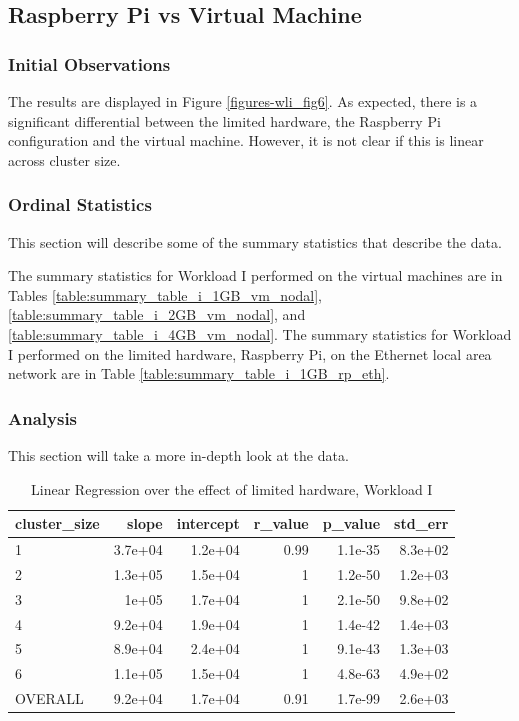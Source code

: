\subsection{Raspberry Pi vs Virtual Machine}
\subsubsection{Initial Observations}
The results are displayed in Figure \ref{figures-wli_fig6}.  As expected, there is a significant differential between the limited hardware, the Raspberry Pi configuration and the virtual machine.  However, it is not clear if this is linear across cluster size. 

\subsubsection{Ordinal Statistics}
This section will describe some of the summary statistics that describe the data.  

The summary statistics for Workload I performed on the virtual machines are in Tables \ref{table:summary_table_i_1GB_vm_nodal}, \ref{table:summary_table_i_2GB_vm_nodal}, and \ref{table:summary_table_i_4GB_vm_nodal}.
The summary statistics for Workload I performed on the limited hardware, Raspberry Pi, on the Ethernet local area network are in Table \ref{table:summary_table_i_1GB_rp_eth}.



\subsubsection{Analysis}
This section will take a more in-depth look at the data.




\begin{table}[H]
\centering
\begin{tabular}{lrrrrr}
\toprule
cluster\_size &   slope &  intercept &  r\_value &  p\_value &  std\_err \\
\midrule
           1 & 3.7e+04 &    1.2e+04 &     0.99 &  1.1e-35 &  8.3e+02 \\
           2 & 1.3e+05 &    1.5e+04 &        1 &  1.2e-50 &  1.2e+03 \\
           3 &   1e+05 &    1.7e+04 &        1 &  2.1e-50 &  9.8e+02 \\
           4 & 9.2e+04 &    1.9e+04 &        1 &  1.4e-42 &  1.4e+03 \\
           5 & 8.9e+04 &    2.4e+04 &        1 &  9.1e-43 &  1.3e+03 \\
           6 & 1.1e+05 &    1.5e+04 &        1 &  4.8e-63 &  4.9e+02 \\
     OVERALL & 9.2e+04 &    1.7e+04 &     0.91 &  1.7e-99 &  2.6e+03 \\
\bottomrule
\end{tabular}
\caption{Linear Regression over the effect of limited hardware, Workload I}
\label{table:rp_v_vm_i}
\end{table}





